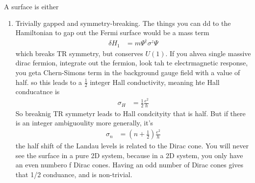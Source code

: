 A surface is either
\begin{enumerate}
    \item Trivially gapped and symmetry-breaking.
        The things you can dd to the Hamiltonian to gap out the Fermi surface
        would be a mass term
        \begin{align}
            \delta H_1 &= m \Psi^\dagger \sigma^z \Psi
        \end{align}
        which breaks TR symmetry, but conserves $U(1)$.
        If you ahvea single massive dirac fermion,
        integrate out the fermion,
        look tah te electrmagnetic response,
        you geta Chern-Simons term in the background gauge field with a value of
        half.
        so this leads to a $\frac{1}{2}$ integer Hall conductivity,
        meaning hte Hall conducatnce is
        \begin{align}
            \sigma_H &= \frac{1}{2} \frac{e^2}{h}
        \end{align}
        So breaknig TR symmetyr leads to Hall condcityity that is half.
        But if there is an integer ambiguoulity more generally,
        it's
        \begin{align}
            \sigma_n &= \left( n + \frac{1}{2} \right) \frac{e^2}{h}
        \end{align}
        the half shift of the Landau levels is related to the Dirac cone.
        You will never see the surface in a pure 2D system,
        because in a 2D system,
        you only have an even numbero f Dirac cones.
        Having an odd number of Dirac cones gives that 1/2 conduance,
        and is non-trivial.


\end{enumerate}
